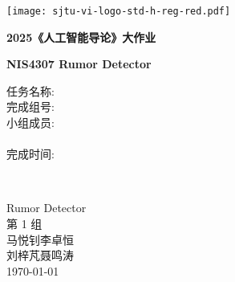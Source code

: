 \begin{titlepage}
    \begin{center}
        \vspace*{1cm}
        \texttt{[image: sjtu-vi-logo-std-h-reg-red.pdf]}
        
        \vfill
        {\Huge\bfseries 2025《人工智能导论》大作业 \par}
        \vspace{1cm}
        {\Large\bfseries NIS4307 Rumor Detector \par}
        \vfill
        
        \large
		\begin{minipage}{0.2\textwidth}
			\begin{flushleft}
                任务名称: \\
                完成组号: \\
                小组成员: \\
                \ \\
                完成时间: 
			\end{flushleft}
		\end{minipage}
		~
		\begin{minipage}{0.27\textwidth}
			\begin{center}
                Rumor Detector \\
                第 1 组 \\
                马悦钊\quad 李卓恒\\
                刘梓芃\quad 聂鸣涛 \\
                \today
			\end{center}
		\end{minipage}

        \vfill
    \end{center}
\end{titlepage}